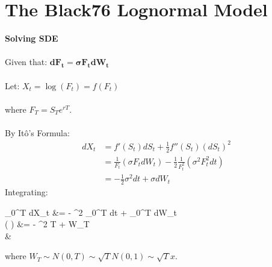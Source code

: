 \documentclass{article}
\begin{document}
\newpage


\section{The Black76 Lognormal Model}
\begin{minipage}[t]{0.5\textwidth}
\begin{tcolorbox}[height=12.4cm,boxsep=5pt,arc=0pt,auto outer arc,colback=white,colframe=black]
	\noindent \textbf{Solving SDE}\\ \\
	\noindent Given that: $\boldsymbol{dF_t = \sigma F_t dW_t}$\\ \\
	\noindent Let: $X_t = \log (F_t) = f(F_t)$\\ \\
	\noindent where $F_T = S_T e^{rT}$.\\ \\
	\noindent By Itô's Formula:
	\begin{align*}
	dX_t &= f'(S_t) dS_t + \frac{1}{2} f''(S_t) (dS_t)^2\\
	&= \frac{1}{F_t} (\sigma F_t dW_t) - \frac{1}{2} \frac{1}{F_t^2} (\sigma^2 F_t^2 dt)\\
	&= -\frac{1}{2} \sigma^2 dt + \sigma dW_t
	\end{align*}
	\noindent Integrating:
	\begin{flalign*}
	\int_{0}^{T} dX_t &= -  \sigma^2 \int_{0}^{T} dt +  \sigma \int_{0}^{T} dW_t\\
	\log \left(  \right) &= - \sigma^2 T + \sigma W_T\\
	&
	\end{flalign*}
	\noindent where $W_T \sim N(0,T) \sim \sqrt{T} N(0,1) \sim \sqrt{T} x$.
\end{tcolorbox}
\end{minipage}
\end{document}
